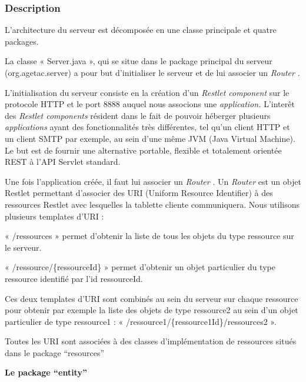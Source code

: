 \documentclass{article}
\begin{document}
\subsubsection{Description}

\vspace{13pt}
\leftskip=0pt
{ L'architecture du serveur est décomposée en une classe principale 
et quatre packages.}

\vspace{13pt}
{ La classe « Server.java », qui se situe dans le package principal 
du serveur (org.agetac.server) a pour but d'initialiser le serveur et de lui associer 
un }{ \textit{Router}}{ .}

{ L'initialisation du serveur consiste en la création d'un }{ \textit{Restlet 
component }}{ sur le protocole HTTP et le port 8888 auquel nous 
associons une }{ \textit{application. }}{ L'interêt 
des }{ \textit{Restlet components}}{  résident dans 
le fait de pouvoir héberger plusieurs }{ \textit{applications}}{  
ayant des fonctionnalités très différentes, tel qu'un client HTTP et un client 
SMTP par exemple, au sein d'une même JVM (Java Virtual Machine). Le but est de 
fournir une alternative portable, flexible et totalement orientée REST à l'API 
Servlet standard.}

{ Une fois l'application créée, il faut lui associer un }{ \textit{Router}}{ . 
Un }{ \textit{Router }}{ est un objet Restlet permettant 
d'associer des URI (Uniform Resource Identifier) à des ressources Restlet avec 
lesquelles la tablette cliente communiquera. Nous utilisons plusieurs templates 
d'URI :}

\leftskip=36pt
\parindent=-18pt
{ « /ressources » permet d'obtenir la liste de tous les objets 
du type ressource sur le serveur.}

{ « /ressource/\{ressourceId\} »  permet d'obtenir un objet particulier 
du type ressource identifié par l'id ressourceId.}

\leftskip=0pt
\parindent=0pt
{ Ces deux templates d'URI sont combinés au sein du serveur sur 
chaque ressource pour obtenir par exemple la liste des objets de type ressource2 
au sein d'un objet particulier de type ressource1 : « /ressource1/\{ressource1Id\}/ressources2 
».}

{ Toutes les URI sont associées à des classes d'implémentation 
de ressources situés dans le package ``resources''}

\vspace{13pt}
{ \textbf{Le package ``entity''}}
\end{document}
